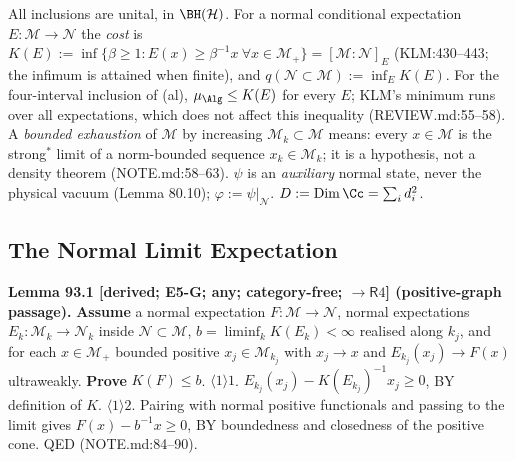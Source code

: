 All inclusions are unital, in \(\BH(\mathcal H)\).  For a normal conditional expectation \(E:\mathcal M\to\mathcal N\) the
\emph{cost} is \(K(E):=\inf\{\beta\ge1:E(x)\ge\beta^{-1}x\ \forall x\in\mathcal M_+\}=[\mathcal M:\mathcal N]_E\) (KLM:430--443;
the infimum is attained when finite), and \(q(\mathcal N\subset\mathcal M):=\inf_EK(E)\).  For the four-interval inclusion
of (al), \(\mu_\Alg\le K(E)\) for every \(E\); KLM's minimum runs over all expectations, which does not affect this
inequality (REVIEW.md:55--58).  A \emph{bounded exhaustion} of \(\mathcal M\) by increasing \(\mathcal M_k\subset\mathcal M\)
means: every \(x\in\mathcal M\) is the strong\(^*\) limit of a norm-bounded sequence \(x_k\in\mathcal M_k\); it is a
hypothesis, not a density theorem (NOTE.md:58--63).  \(\psi\) is an \emph{auxiliary} normal state, never the physical
vacuum (Lemma 80.10); \(\varphi:=\psi|_{\mathcal N}\).  \(D:=\operatorname{Dim}\Cc=\sum_id_i^2\).

\subsection{The Normal Limit Expectation}

\textbf{Lemma 93.1 [derived; E5-G; any; category-free; \(\to\mathsf R4\)] (positive-graph passage).}
\textbf{Assume} a normal expectation \(F:\mathcal M\to\mathcal N\), normal expectations \(E_k:\mathcal M_k\to\mathcal N_k\)
inside \(\mathcal N\subset\mathcal M\), \(b=\liminf_kK(E_k)<\infty\) realised along \(k_j\), and for each
\(x\in\mathcal M_+\) bounded positive \(x_j\in\mathcal M_{k_j}\) with \(x_j\to x\) and \(E_{k_j}(x_j)\to F(x)\) ultraweakly.
\textbf{Prove} \(K(F)\le b\).
\(\langle1\rangle1\). \(E_{k_j}(x_j)-K(E_{k_j})^{-1}x_j\ge0\), BY definition of \(K\).
\(\langle1\rangle2\). Pairing with normal positive functionals and passing to the limit gives \(F(x)-b^{-1}x\ge0\),
BY boundedness and closedness of the positive cone.  QED (NOTE.md:84--90).

